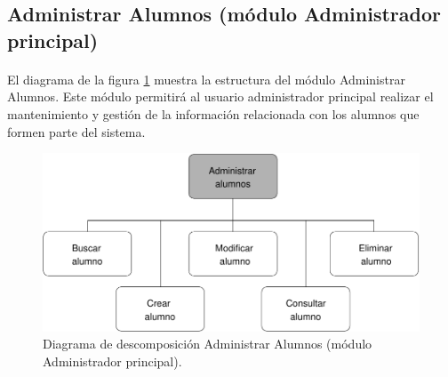 \subsection{Administrar Alumnos (módulo Administrador principal)}

  \paragraph{}El diagrama de la figura
  \ref{diagramaDescomposicionAdministrarAlumnos} muestra la estructura del
  módulo Administrar Alumnos. Este módulo permitirá al usuario administrador
  principal realizar el mantenimiento y gestión de la información relacionada
  con los alumnos que formen parte del sistema.

  \begin{figure}[!ht]
    \begin{center}
      \includegraphics[]{11.Disenyo_Arquitectonico/11.2.Diagramas_Descomposicion/11.2.2.Modulo_administrador_principal/AdministrarBBDD/AdministrarUsuarios/AdministrarAlumnos/Diagramas/administrar_alumnos.pdf}
      \caption{Diagrama de descomposición Administrar Alumnos (módulo Administrador principal).}
      \label{diagramaDescomposicionAdministrarAlumnos}
    \end{center}
  \end{figure}
